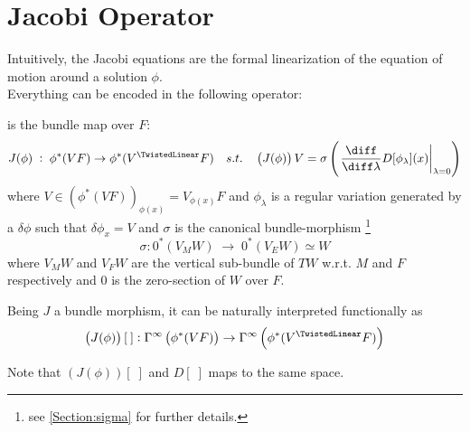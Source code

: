 \documentclass[a4paper,12pt,fleqn]{scrartcl}  %
\begin{document}
\section{Jacobi Operator}\label{Sec:JacobiOperator}
Intuitively, the Jacobi equations are the formal linearization of the equation of motion around a solution $\phi$.\\
Everything can be encoded in the following operator:
%
	\begin{definition}\label{Def:JacobiOp} is the bundle map over $F$:
		\begin{displaymath}
			J(\phi) \; : \; \phi^\ast(VF) \rightarrow	\phi^\ast(V^\TwistedLinear F) 
			\quad s.t. \quad  \left(J(\phi)\right) V
			= \sigma \left( \left.\dfrac{\diff}{\diff \lambda} D [\phi_\lambda](x) \right\rvert_{\lambda=0} \right)
		\end{displaymath}
		where $V\in (\phi^\ast(VF))_{\phi(x)} = V_{\phi(x)}F$ and $\phi_\lambda$ is a regular variation generated by a $\delta\phi$ such that $\delta\phi_x = V$ and
		$\sigma$ is the canonical bundle-morphism \footnote{see \ref{Section:sigma} for further details.}
		\begin{displaymath}
			\sigma:  0^\ast \left( V_M W \right)  \; \rightarrow \;  0^\ast \left(V_E W \right) \simeq W
		\end{displaymath}
		 where $V_M W$ and $V_F W$ are the vertical sub-bundle of $T W$ w.r.t. $M$ and $F$ respectively 
		 and $0$ is the zero-section of $W$ over $F$.
	\end{definition}
	\begin{remark}
		Being $J$ a bundle morphism, it can be naturally interpreted functionally as
		\begin{displaymath}
			\left(J(\phi)\right) [\: ] : 
			\Gamma^\infty\left(\phi^\ast(VF)\right) \rightarrow	
			\Gamma^\infty \left( 
			\phi^\ast(V^\TwistedLinear F)
			\right)
		\end{displaymath}
	\end{remark}
%
  \begin{minipage}[r]{0.80\textwidth}
  	
  \end{minipage}\hfill
  \begin{minipage}[l]{0.20\textwidth}
	Note that $ \left(J(\phi)\right) [ \; ]$ and $D[\;]$ maps to the same space.
  \end{minipage}
\end{document}
